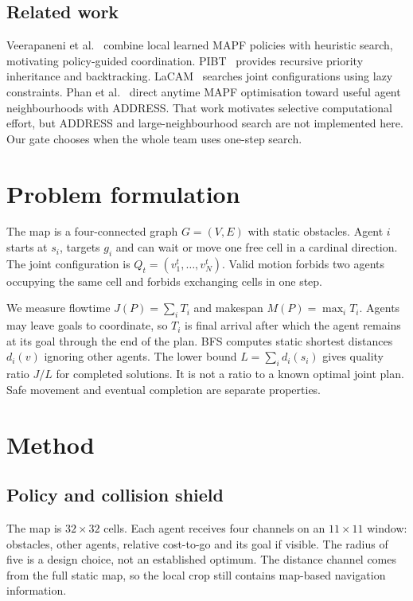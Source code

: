 \documentclass[10pt,a4paper]{article}
\begin{document}
\subsection{Related work}
Veerapaneni et al.~\cite{veerapaneni} combine local learned MAPF policies with heuristic search, motivating policy-guided coordination. PIBT~\cite{pibt} provides recursive priority inheritance and backtracking. LaCAM~\cite{lacam} searches joint configurations using lazy constraints. Phan et al.~\cite{address} direct anytime MAPF optimisation toward useful agent neighbourhoods with ADDRESS. That work motivates selective computational effort, but ADDRESS and large-neighbourhood search are not implemented here. Our gate chooses when the whole team uses one-step search.

\section{Problem formulation}
The map is a four-connected graph $G=(V,E)$ with static obstacles. Agent $i$ starts at $s_i$, targets $g_i$ and can wait or move one free cell in a cardinal direction. The joint configuration is $Q_t=(v_1^t,\ldots,v_N^t)$. Valid motion forbids two agents occupying the same cell and forbids exchanging cells in one step.

We measure flowtime $J(P)=\sum_i T_i$ and makespan $M(P)=\max_i T_i$. Agents may leave goals to coordinate, so $T_i$ is final arrival after which the agent remains at its goal through the end of the plan. BFS computes static shortest distances $d_i(v)$ ignoring other agents. The lower bound $L=\sum_i d_i(s_i)$ gives quality ratio $J/L$ for completed solutions. It is not a ratio to a known optimal joint plan. Safe movement and eventual completion are separate properties.

\newpage
\section{Method}
\subsection{Policy and collision shield}
The map is $32\times32$ cells. Each agent receives four channels on an $11\times11$ window: obstacles, other agents, relative cost-to-go and its goal if visible. The radius of five is a design choice, not an established optimum. The distance channel comes from the full static map, so the local crop still contains map-based navigation information.
\end{document}
